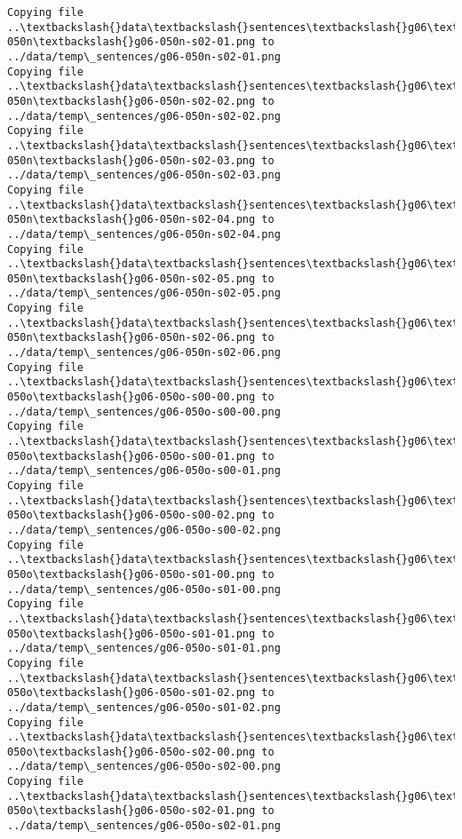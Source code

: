\documentclass[11pt]{article}
\begin{document}
\begin{Verbatim}[commandchars=\\\{\}]
Copying file ..\textbackslash{}data\textbackslash{}sentences\textbackslash{}g06\textbackslash{}g06-050n\textbackslash{}g06-050n-s02-01.png to
../data/temp\_sentences/g06-050n-s02-01.png
Copying file ..\textbackslash{}data\textbackslash{}sentences\textbackslash{}g06\textbackslash{}g06-050n\textbackslash{}g06-050n-s02-02.png to
../data/temp\_sentences/g06-050n-s02-02.png
Copying file ..\textbackslash{}data\textbackslash{}sentences\textbackslash{}g06\textbackslash{}g06-050n\textbackslash{}g06-050n-s02-03.png to
../data/temp\_sentences/g06-050n-s02-03.png
Copying file ..\textbackslash{}data\textbackslash{}sentences\textbackslash{}g06\textbackslash{}g06-050n\textbackslash{}g06-050n-s02-04.png to
../data/temp\_sentences/g06-050n-s02-04.png
Copying file ..\textbackslash{}data\textbackslash{}sentences\textbackslash{}g06\textbackslash{}g06-050n\textbackslash{}g06-050n-s02-05.png to
../data/temp\_sentences/g06-050n-s02-05.png
Copying file ..\textbackslash{}data\textbackslash{}sentences\textbackslash{}g06\textbackslash{}g06-050n\textbackslash{}g06-050n-s02-06.png to
../data/temp\_sentences/g06-050n-s02-06.png
Copying file ..\textbackslash{}data\textbackslash{}sentences\textbackslash{}g06\textbackslash{}g06-050o\textbackslash{}g06-050o-s00-00.png to
../data/temp\_sentences/g06-050o-s00-00.png
Copying file ..\textbackslash{}data\textbackslash{}sentences\textbackslash{}g06\textbackslash{}g06-050o\textbackslash{}g06-050o-s00-01.png to
../data/temp\_sentences/g06-050o-s00-01.png
Copying file ..\textbackslash{}data\textbackslash{}sentences\textbackslash{}g06\textbackslash{}g06-050o\textbackslash{}g06-050o-s00-02.png to
../data/temp\_sentences/g06-050o-s00-02.png
Copying file ..\textbackslash{}data\textbackslash{}sentences\textbackslash{}g06\textbackslash{}g06-050o\textbackslash{}g06-050o-s01-00.png to
../data/temp\_sentences/g06-050o-s01-00.png
Copying file ..\textbackslash{}data\textbackslash{}sentences\textbackslash{}g06\textbackslash{}g06-050o\textbackslash{}g06-050o-s01-01.png to
../data/temp\_sentences/g06-050o-s01-01.png
Copying file ..\textbackslash{}data\textbackslash{}sentences\textbackslash{}g06\textbackslash{}g06-050o\textbackslash{}g06-050o-s01-02.png to
../data/temp\_sentences/g06-050o-s01-02.png
Copying file ..\textbackslash{}data\textbackslash{}sentences\textbackslash{}g06\textbackslash{}g06-050o\textbackslash{}g06-050o-s02-00.png to
../data/temp\_sentences/g06-050o-s02-00.png
Copying file ..\textbackslash{}data\textbackslash{}sentences\textbackslash{}g06\textbackslash{}g06-050o\textbackslash{}g06-050o-s02-01.png to
../data/temp\_sentences/g06-050o-s02-01.png

\end{Verbatim}
\end{document}
